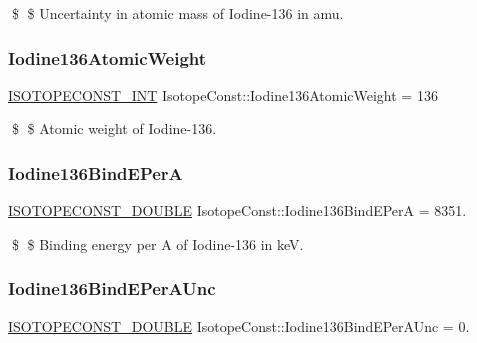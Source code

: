 \$ \$ Uncertainty in atomic mass of Iodine-\/136 in amu. \mbox{\label{group___isotope_const-_iodine-_i136_gabcdb23ad459dc9e3e68d11b949e44e07}} 
\subsubsection{\texorpdfstring{Iodine136\+Atomic\+Weight}{Iodine136AtomicWeight}}
{\footnotesize\ttfamily \mbox{\hyperlink{group___isotope_const-_macros_ga5f18360b3e99483a35c32d789e62621c}{I\+S\+O\+T\+O\+P\+E\+C\+O\+N\+S\+T\+\_\+\+I\+NT}} Isotope\+Const\+::\+Iodine136\+Atomic\+Weight = 136}

\$ \$ Atomic weight of Iodine-\/136. \mbox{\label{group___isotope_const-_iodine-_i136_gabefd4d97fd0b3dfc9a6a025307caaf60}} 
\subsubsection{\texorpdfstring{Iodine136\+Bind\+E\+PerA}{Iodine136BindEPerA}}
{\footnotesize\ttfamily \mbox{\hyperlink{group___isotope_const-_macros_ga8f45a7272ce02c0b4c65c44636ed719a}{I\+S\+O\+T\+O\+P\+E\+C\+O\+N\+S\+T\+\_\+\+D\+O\+U\+B\+LE}} Isotope\+Const\+::\+Iodine136\+Bind\+E\+PerA = 8351.}

\$ \$ Binding energy per A of Iodine-\/136 in keV. \mbox{\label{group___isotope_const-_iodine-_i136_ga5167780ceea58d8f403ed6caabb29008}} 
\subsubsection{\texorpdfstring{Iodine136\+Bind\+E\+Per\+A\+Unc}{Iodine136BindEPerAUnc}}
{\footnotesize\ttfamily \mbox{\hyperlink{group___isotope_const-_macros_ga8f45a7272ce02c0b4c65c44636ed719a}{I\+S\+O\+T\+O\+P\+E\+C\+O\+N\+S\+T\+\_\+\+D\+O\+U\+B\+LE}} Isotope\+Const\+::\+Iodine136\+Bind\+E\+Per\+A\+Unc = 0.}


